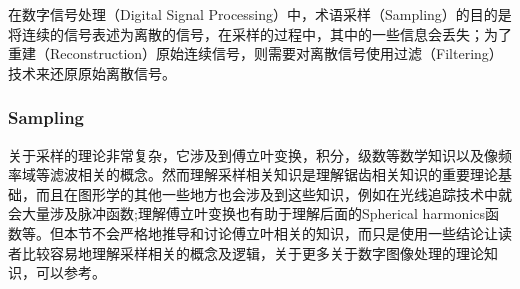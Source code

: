 \documentclass[10pt,fancyhdr,graybox, envcountchap,oribibl,twoside]{svmono}
\begin{document}
在数字信号处理（Digital Signal Processing）中，术语采样（Sampling）的目的是将连续的信号表述为离散的信号，在采样的过程中，其中的一些信息会丢失；为了重建（Reconstruction）原始连续信号，则需要对离散信号使用过滤（Filtering）技术来还原原始离散信号。



\subsubsection{Sampling}
关于采样的理论非常复杂，它涉及到傅立叶变换，积分，级数等数学知识以及像频率域等滤波相关的概念。然而理解采样相关知识是理解锯齿相关知识的重要理论基础，而且在图形学的其他一些地方也会涉及到这些知识，例如在光线追踪技术中就会大量涉及脉冲函数;理解傅立叶变换也有助于理解后面的Spherical harmonics函数等。但本节不会严格地推导和讨论傅立叶相关的知识，而只是使用一些结论让读者比较容易地理解采样相关的概念及逻辑，关于更多关于数字图像处理的理论知识，可以参考\cite{b:DigitalImageProcessing}。
\end{document}
